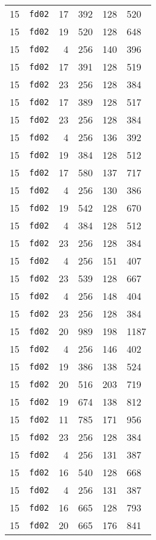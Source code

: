 \documentclass{article}
\begin{document}
\begin{table}[h!]
\begin{tabular}{llrrrl}
    15 & \texttt{fd02} & 17 & 392 & 128 & 520 \\
    15 & \texttt{fd02} & 19 & 520 & 128 & 648 \\
    15 & \texttt{fd02} & 4 & 256 & 140 & 396 \\
    15 & \texttt{fd02} & 17 & 391 & 128 & 519 \\
    15 & \texttt{fd02} & 23 & 256 & 128 & 384 \\
    15 & \texttt{fd02} & 17 & 389 & 128 & 517 \\
    15 & \texttt{fd02} & 23 & 256 & 128 & 384 \\
    15 & \texttt{fd02} & 4 & 256 & 136 & 392 \\
    15 & \texttt{fd02} & 19 & 384 & 128 & 512 \\
    15 & \texttt{fd02} & 17 & 580 & 137 & 717 \\
    15 & \texttt{fd02} & 4 & 256 & 130 & 386 \\
    15 & \texttt{fd02} & 19 & 542 & 128 & 670 \\
    15 & \texttt{fd02} & 4 & 384 & 128 & 512 \\
    15 & \texttt{fd02} & 23 & 256 & 128 & 384 \\
    15 & \texttt{fd02} & 4 & 256 & 151 & 407 \\
    15 & \texttt{fd02} & 23 & 539 & 128 & 667 \\
    15 & \texttt{fd02} & 4 & 256 & 148 & 404 \\
    15 & \texttt{fd02} & 23 & 256 & 128 & 384 \\
    15 & \texttt{fd02} & 20 & 989 & 198 & 1187 \\
    15 & \texttt{fd02} & 4 & 256 & 146 & 402 \\
    15 & \texttt{fd02} & 19 & 386 & 138 & 524 \\
    15 & \texttt{fd02} & 20 & 516 & 203 & 719 \\
    15 & \texttt{fd02} & 19 & 674 & 138 & 812 \\
    15 & \texttt{fd02} & 11 & 785 & 171 & 956 \\
    15 & \texttt{fd02} & 23 & 256 & 128 & 384 \\
    15 & \texttt{fd02} & 4 & 256 & 131 & 387 \\
    15 & \texttt{fd02} & 16 & 540 & 128 & 668 \\
    15 & \texttt{fd02} & 4 & 256 & 131 & 387 \\
    15 & \texttt{fd02} & 16 & 665 & 128 & 793 \\
    15 & \texttt{fd02} & 20 & 665 & 176 & 841 \\

\end{tabular}
\end{table}
\end{document}
